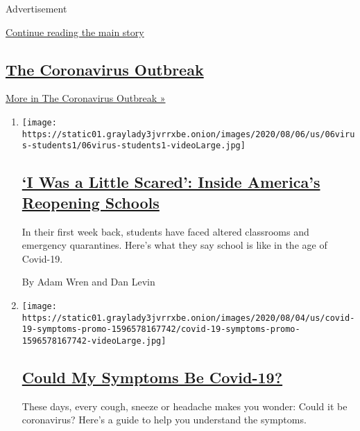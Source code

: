 Advertisement

\protect\hyperlink{after-mid1}{Continue reading the main story}

\hypertarget{the-coronavirus-outbreak}{%
\subsection{\texorpdfstring{\href{/news-event/coronavirus}{The
Coronavirus
Outbreak}}{The Coronavirus Outbreak}}\label{the-coronavirus-outbreak}}

\href{/news-event/coronavirus}{More in The Coronavirus Outbreak »}

\begin{enumerate}
\def\labelenumi{\arabic{enumi}.}
\item
  \texttt{[image: https://static01.graylady3jvrrxbe.onion/images/2020/08/06/us/06virus-students1/06virus-students1-videoLarge.jpg]}

  \hypertarget{i-was-a-little-scared-inside-americas-reopening-schools}{%
  \subsection{\texorpdfstring{\href{/2020/08/06/us/coronavirus-students.html}{`I
  Was a Little Scared': Inside America's Reopening
  Schools}}{`I Was a Little Scared': Inside America's Reopening Schools}}\label{i-was-a-little-scared-inside-americas-reopening-schools}}

  In their first week back, students have faced altered classrooms and
  emergency quarantines. Here's what they say school is like in the age
  of Covid-19.

  By Adam Wren and Dan Levin
\item
  \texttt{[image: https://static01.graylady3jvrrxbe.onion/images/2020/08/04/us/covid-19-symptoms-promo-1596578167742/covid-19-symptoms-promo-1596578167742-videoLarge.jpg]}

  \hypertarget{could-my-symptoms-be-covid-19}{%
  \subsection{\texorpdfstring{\href{/interactive/2020/08/05/well/covid-19-symptoms.html}{Could
  My Symptoms Be
  Covid-19?}}{Could My Symptoms Be Covid-19?}}\label{could-my-symptoms-be-covid-19}}

  These days, every cough, sneeze or headache makes you wonder: Could it
  be coronavirus? Here's a guide to help you understand the symptoms.


\end{enumerate}
